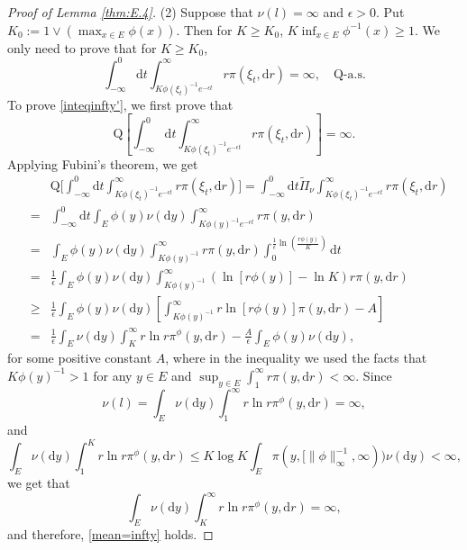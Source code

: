 \documentclass[12pt,a4paper]{amsart}
\numberwithin{equation}{section}
\theoremstyle{plain}
\theoremstyle{definition}
\theoremstyle{remark}
\begin{document}
\begin{proof}[Proof of Lemma \ref{thm:E.4}]
(2) Suppose that $\nu(l)=\infty$ and $\epsilon>0$.
Put $K_0:=1\vee(\max_{x\in E}\phi(x))$.
Then for $K\ge K_0$, $ K\inf_{x\in E}\phi^{-1}(x)\geq 1$.   We  only need to prove that for $K\ge K_0$,
\begin{equation}\label{inteqinfty'}
\int_{-\infty}^{0} \mathrm dt\int_{K\phi(\xi_t)^{-1}e^{-\epsilon t}}^\infty r\pi(\xi_t,\mathrm dr)
=\infty,\quad \mathrm Q\mbox{-a.s.}
\end{equation}
To prove \eqref{inteqinfty'}, we first prove that
\begin{equation}\label{mean=infty}
 \mathrm Q\left[\int_{-\infty}^{0} \mathrm dt\int_{K\phi(\xi_t)^{-1}
e^{-\epsilon t}}^\infty r \pi(\xi_t, \mathrm dr)\right]=\infty.
\end{equation}
Applying Fubini's theorem, we get
\begin{eqnarray*}
&&\mathrm Q\Big[\int_{-\infty}^{0} \mathrm dt\int_{K\phi(\xi_t)^{-1}e^{-\epsilon t}}^{\infty} r \pi(\xi_t, \mathrm dr)\Big]=\int_{-\infty}^{0} \mathrm dt \widetilde{\Pi}_\nu\int_{K\phi(\xi_t)^{-1}e^{-\epsilon t}}^{\infty} r\pi(\xi_t, \mathrm dr)\\
&=& \int_{-\infty}^{0} \mathrm dt\int_E\phi(y)\nu(\mathrm dy)\int_{K\phi(y)^{-1}e^{-\epsilon t}}^\infty r\pi(y, \mathrm dr)\\
&=& \int_E\phi(y)\nu(\mathrm dy)\int_{K\phi(y)^{-1}}^\infty r\pi(y, \mathrm dr)\int_{0}^{\frac{1}{\epsilon}\ln(\frac{r\phi(y)}{K})}\mathrm dt\\
&=&\frac{1}{\epsilon}\int_E\phi(y)\nu(\mathrm dy)\int_{K\phi(y)^{-1}}^\infty(\ln[r\phi(y)]-\ln K)r\pi(y, \mathrm dr)\\
&\ge&\frac{1}{\epsilon}\int_E\phi(y)\nu(\mathrm dy)\left[\int_{K\phi(y)^{-1}}^\infty r\ln[r\phi(y)]\pi(y, \mathrm dr)-A\right]\\
&=&\frac{1}{\epsilon}\int_E\nu(\mathrm dy) \int_{K}^\infty r\ln r\pi^\phi(y, \mathrm dr)-\frac{A}{\epsilon}\int_E\phi(y)\nu(\mathrm dy),
\end{eqnarray*}
for some positive constant $A$, where in the inequality we used the
facts that $K\phi(y)^{-1}>1$ for any
$y\in E$ and $\sup_{y\in E}\int^\infty_1r \pi(y,\mathrm dr)<\infty$.
Since
$$
\nu(l)=\int_E\nu(\mathrm dy)\int_1^\infty r\ln r \pi^\phi(y,\mathrm dr)=\infty,
$$
and
$$
\int_E\nu(\mathrm dy)\int_{1}^{K} r\ln r \pi^\phi(y, \mathrm dr)\leq K\log K\int_E \pi(y,[\|\phi\|_{\infty}^{-1},\infty))\nu(\mathrm dy)<\infty,
$$
we get that
$$
\int_E\nu(\mathrm dy)\int_{K}^\infty r\ln r \pi^\phi(y, \mathrm dr)=\infty,
$$
and therefore, \eqref{mean=infty} holds.



\end{proof}
\end{document}
